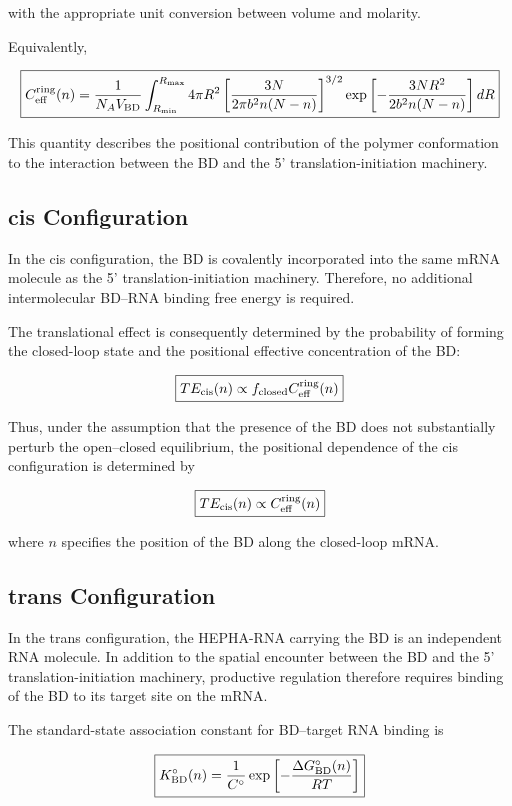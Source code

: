 \documentclass{article}
\begin{document}
with the appropriate unit conversion between volume and molarity.

Equivalently,

\[
\boxed{
C_{\rm eff}^{\rm ring}(n)
=
\frac{1}{N_A V_{\rm BD}}
\int_{R_{\min}}^{R_{\max}}
4\pi R^2
\left[
\frac{3N}
{2\pi b^2n(N-n)}
\right]^{3/2}
\exp\left[
-\frac{3NR^2}
{2b^2n(N-n)}
\right]dR
}
\]

This quantity describes the positional contribution of the polymer conformation to the interaction between the BD and the 5' translation-initiation machinery.

\subsection{cis Configuration}

In the cis configuration, the BD is covalently incorporated into the same mRNA molecule as the 5' translation-initiation machinery. Therefore, no additional intermolecular BD--RNA binding free energy is required.

The translational effect is consequently determined by the probability of forming the closed-loop state and the positional effective concentration of the BD:

\[
\boxed{
TE_{\rm cis}(n)
\propto
f_{\rm closed}
C_{\rm eff}^{\rm ring}(n)
}
\]

Thus, under the assumption that the presence of the BD does not substantially perturb the open--closed equilibrium, the positional dependence of the cis configuration is determined by

\[
\boxed{
TE_{\rm cis}(n)
\propto
C_{\rm eff}^{\rm ring}(n)
}
\]

where \(n\) specifies the position of the BD along the closed-loop mRNA.

\subsection{trans Configuration}

In the trans configuration, the HEPHA-RNA carrying the BD is an independent RNA molecule. In addition to the spatial encounter between the BD and the 5' translation-initiation machinery, productive regulation therefore requires binding of the BD to its target site on the mRNA.

The standard-state association constant for BD--target RNA binding is

\[
\boxed{
K_{\rm BD}^{\circ}(n)
=
\frac{1}{C^\circ}
\exp\left[
-\frac{\Delta G_{\rm BD}^{\circ}(n)}
{RT}
\right]
}
\]
\end{document}
